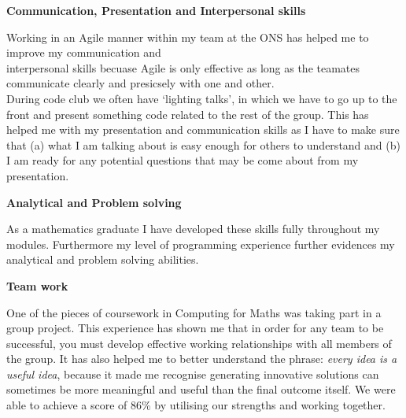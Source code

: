 \documentclass[10pt]{res}
\begin{document}
\begin{resume}
\vspace{-5pt}
\textbf{Communication, Presentation and Interpersonal skills}
\begin{addmargin}[2em]{0em}
    Working in an Agile manner within my team at the ONS has helped me to
    improve my communication and \\ interpersonal skills becuase Agile is only
    effective as long as the teamates communicate clearly and presicsely with
    one and other.
    \\[4pt]
    During code club we often have `lighting talks', in which we have to go
    up to the front and present something code related to the rest of the group.
    This has helped me with my presentation and communication skills as I have
    to make sure that (a) what I am talking about is easy enough for others to
    understand and (b) I am ready for any potential questions that may be come
    about from my presentation.
\end{addmargin}

\vspace{-5pt}
\textbf{Analytical and Problem solving}
\begin{addmargin}[3em]{0em}
    As a mathematics graduate I have developed these skills fully throughout my
    modules. Furthermore my level of programming experience further evidences my
    analytical and problem solving abilities.
\end{addmargin}

\vspace{-5pt}
\textbf{Team work}
\begin{addmargin}[2em]{0em}
    One of the pieces of coursework in Computing for Maths was taking part in a
    group project. This experience has shown me that in order for any team to be
    successful, you must develop effective working relationships with all
    members of the group. It has also helped me to better understand the
    phrase: \textit{every idea is a useful idea}, because it made me recognise
    generating innovative solutions can sometimes be more meaningful and useful
    than the final outcome itself. We were able to achieve a score of 86\% by
    utilising our strengths and working together.
\end{addmargin}


\end{resume}
\end{document}
